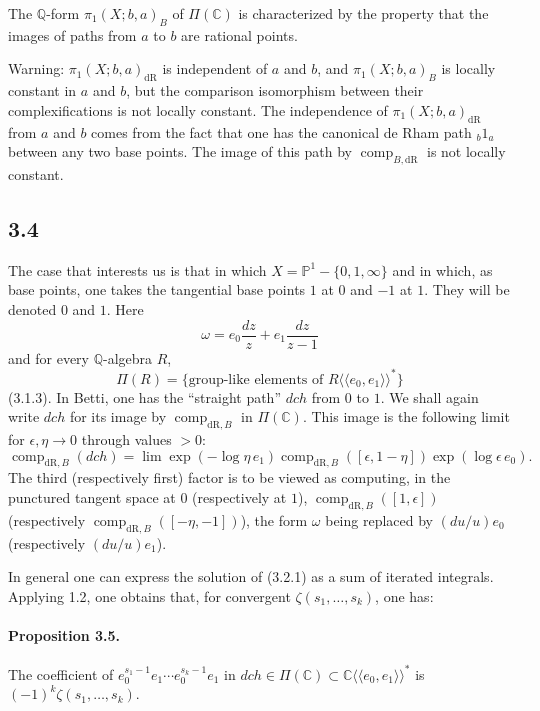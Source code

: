 \documentclass[11pt]{article}
\newcommand{\Q}{\mathbb Q}
\newcommand{\C}{\mathbb C}
\newcommand{\PP}{\mathbb P}
\newcommand{\comp}{\operatorname{comp}}
\newcommand{\dR}{\mathrm{dR}}
\begin{document}
The $\Q$-form $\pi_1(X;b,a)_B$ of $\Pi(\C)$ is characterized by the property that the images of paths from $a$ to $b$ are rational points.

Warning: $\pi_1(X;b,a)_{\dR}$ is independent of $a$ and $b$, and $\pi_1(X;b,a)_B$ is locally constant in $a$ and $b$, but the comparison isomorphism between their complexifications is not locally constant.
The independence of $\pi_1(X;b,a)_{\dR}$ from $a$ and $b$ comes from the fact that one has the canonical de Rham path ${}_b1_a$ between any two base points.
The image of this path by $\comp_{B,\dR}$ is not locally constant.

\subsection*{3.4}
The case that interests us is that in which $X=\PP^1-\{0,1,\infty\}$ and in which, as base points, one takes the tangential base points $1$ at $0$ and $-1$ at $1$.
They will be denoted $0$ and $1$.
Here
\[
 \omega=e_0\frac{dz}{z}+e_1\frac{dz}{z-1}
\]
and for every $\Q$-algebra $R$,
\[
 \Pi(R)=\{\text{group-like elements of }R\langle\!\langle e_0,e_1\rangle\!\rangle^*\}
\]
(3.1.3).
In Betti, one has the ``straight path'' $dch$ from $0$ to $1$.
We shall again write $dch$ for its image by $\comp_{\dR,B}$ in $\Pi(\C)$.
This image is the following limit for $\epsilon,\eta\to0$ through values $>0$:
\begin{equation}
\comp_{\dR,B}(dch)=\lim \exp(-\log\eta\,e_1)\comp_{\dR,B}([\epsilon,1-\eta])\exp(\log\epsilon\,e_0).
\tag{3.4.1}
\end{equation}
The third (respectively first) factor is to be viewed as computing, in the punctured tangent space at $0$ (respectively at $1$), $\comp_{\dR,B}([1,\epsilon])$ (respectively $\comp_{\dR,B}([-\eta,-1])$), the form $\omega$ being replaced by $(du/u)e_0$ (respectively $(du/u)e_1$).

In general one can express the solution of (3.2.1) as a sum of iterated integrals.
Applying 1.2, one obtains that, for convergent $\zeta(s_1,\ldots,s_k)$, one has:

\paragraph{Proposition 3.5.}
The coefficient of $e_0^{s_1-1}e_1\cdots e_0^{s_k-1}e_1$ in
$dch\in\Pi(\C)\subset\C\langle\!\langle e_0,e_1\rangle\!\rangle^*$ is
$(-1)^k\zeta(s_1,\ldots,s_k)$.
\end{document}
